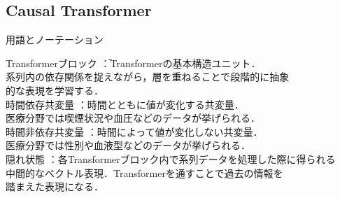 \documentclass[dvipdfmx]{jreport}
\begin{document}
\subsection{Causal Transformer} \label{ct}
\begin{itembox}[l]{\large{用語とノーテーション}}
    \begin{tabbing}
        \hspace{15pt} \raisebox{0.5ex}{\tiny $\bullet$} Transformerブロック \hspace{25pt}\=：Transformerの基本構造ユニット．\\[0.5em]\>\hspace{6.5pt}系列内の依存関係を捉えながら，層を重ねることで段階的に抽象\\[0.5em]\>\hspace{6.5pt}的な表現を学習する．\\[0.5em]
        \hspace{15pt} \raisebox{0.5ex}{\tiny $\bullet$} 時間依存共変量 \>：時間とともに値が変化する共変量．\\[0.5em]\>\hspace{6.5pt}医療分野では喫煙状況や血圧などのデータが挙げられる．\\[0.5em]
        \hspace{15pt} \raisebox{0.5ex}{\tiny $\bullet$} 時間非依存共変量 \>：時間によって値が変化しない共変量．\\[0.5em]\>\hspace{6.5pt}医療分野では性別や血液型などのデータが挙げられる．\\[0.5em]
        \hspace{15pt} \raisebox{0.5ex}{\tiny $\bullet$} 隠れ状態 \>：各Transformerブロック内で系列データを処理した際に得られる\\[0.5em]\>\hspace{6.5pt}中間的なベクトル表現．Transformerを通すことで過去の情報を\\[0.5em]\>\hspace{6.5pt}踏まえた表現になる．\\[0.5em]

\end{tabbing}
\end{itembox}
\end{document}
